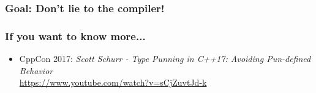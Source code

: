 \documentclass[aspectratio=169]{beamer}
\begin{document}
\begin{frame}[fragile]
  \frametitle{Goal: Don't lie to the compiler!}
\end{frame}

\begin{frame}
  \frametitle{If you want to know more...}

  \begin{itemize}
  \item CppCon 2017: \emph{Scott Schurr - Type Punning in C++17: Avoiding Pun-defined Behavior} \\ \href{https://www.youtube.com/watch?v=sCjZuvtJd-k}{https://www.youtube.com/watch?v=sCjZuvtJd-k}
  \end{itemize}
    
\end{frame}
\end{document}
